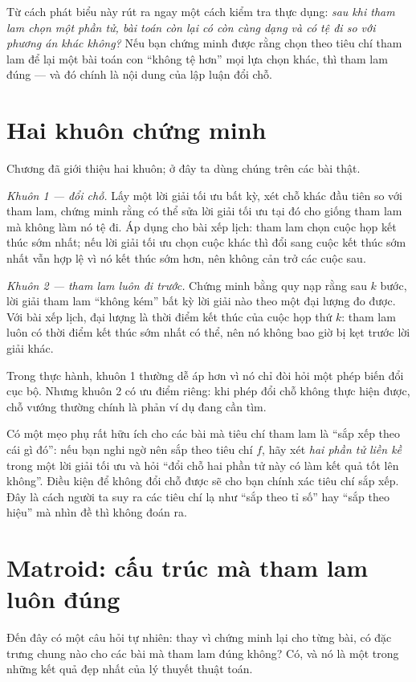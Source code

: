 \documentclass[../../algorithm.tex]{subfiles}
\begin{document}
Từ cách phát biểu này rút ra ngay một cách kiểm tra thực dụng: \emph{sau khi tham lam chọn một phần tử, bài toán còn lại có còn cùng dạng và có tệ đi so với phương án khác không?} Nếu bạn chứng minh được rằng chọn theo tiêu chí tham lam để lại một bài toán con ``không tệ hơn'' mọi lựa chọn khác, thì tham lam đúng --- và đó chính là nội dung của lập luận đổi chỗ.

\section{Hai khuôn chứng minh}

Chương  đã giới thiệu hai khuôn; ở đây ta dùng chúng trên các bài thật.

\emph{Khuôn 1 --- đổi chỗ.} Lấy một lời giải tối ưu bất kỳ, xét chỗ khác đầu tiên so với tham lam, chứng minh rằng có thể sửa lời giải tối ưu tại đó cho giống tham lam mà không làm nó tệ đi. Áp dụng cho bài xếp lịch: tham lam chọn cuộc họp kết thúc sớm nhất; nếu lời giải tối ưu chọn cuộc khác thì đổi sang cuộc kết thúc sớm nhất vẫn hợp lệ vì nó kết thúc sớm hơn, nên không cản trở các cuộc sau.

\emph{Khuôn 2 --- tham lam luôn đi trước.} Chứng minh bằng quy nạp rằng sau \(k\) bước, lời giải tham lam ``không kém'' bất kỳ lời giải nào theo một đại lượng đo được. Với bài xếp lịch, đại lượng là thời điểm kết thúc của cuộc họp thứ \(k\): tham lam luôn có thời điểm kết thúc sớm nhất có thể, nên nó không bao giờ bị kẹt trước lời giải khác.

Trong thực hành, khuôn 1 thường dễ áp hơn vì nó chỉ đòi hỏi một phép biến đổi cục bộ. Nhưng khuôn 2 có ưu điểm riêng: khi phép đổi chỗ không thực hiện được, chỗ vướng thường chính là phản ví dụ đang cần tìm.

Có một mẹo phụ rất hữu ích cho các bài mà tiêu chí tham lam là ``sắp xếp theo cái gì đó'': nếu bạn nghi ngờ nên sắp theo tiêu chí \(f\), hãy xét \emph{hai phần tử liền kề} trong một lời giải tối ưu và hỏi ``đổi chỗ hai phần tử này có làm kết quả tốt lên không''. Điều kiện để không đổi chỗ được sẽ cho bạn chính xác tiêu chí sắp xếp. Đây là cách người ta suy ra các tiêu chí lạ như ``sắp theo tỉ số'' hay ``sắp theo hiệu'' mà nhìn đề thì không đoán ra.

\section{Matroid: cấu trúc mà tham lam luôn đúng}

Đến đây có một câu hỏi tự nhiên: thay vì chứng minh lại cho từng bài, có đặc trưng chung nào cho các bài mà tham lam đúng không? Có, và nó là một trong những kết quả đẹp nhất của lý thuyết thuật toán.
\end{document}
